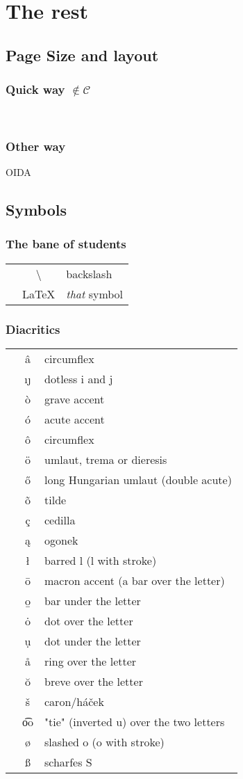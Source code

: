 \documentclass[11pt,a4paper]{report}
\newcommand{\package}[1]{\code{\usepackage{#1}}\label{#1}}
\newcommand{\noncurs}{\hspace{.5cm}$\notin \mathscr{C}$}
\newcommand{\explain}[2]{\code{#1} & #1 & #2\\}
\begin{document}
{\chapter{The rest}
\pagestyle{plain}
\section{Page Size and layout}
\subsection[Quick way]{Quick way \noncurs}
\package{geometry}\\
\code{\geometry{a4paper,left=30mm,right=20mm,top=20mm,bottom=30mm}}

\subsection{Other way}
OIDA



\section{Symbols}
\subsection{The bane of students}
\begin{longtable}{l c l}
\code{$\backslash$ \textbackslash} & \textbackslash & backslash \\
\explain{\LaTeX}{\textit{that} symbol}
\end{longtable}

\subsection{Diacritics}
\begin{longtable}{l c l}
\explain{\^{a}}{circumflex}
\explain{\i \j}{dotless i and j}
\explain{\`{o}}{grave accent}
\explain{\'{o}}{acute accent}
\explain{\^{o}}{circumflex}
\explain{\"{o}}{umlaut, trema or dieresis}
\explain{\H{o}}{long Hungarian umlaut (double acute)}
\explain{\~{o}}{tilde}
\explain{\c{c}}{cedilla}
\explain{\k{a}}{ogonek}
\explain{\l{}}{barred l (l with stroke)}
\explain{\={o}}{macron accent (a bar over the letter)}
\explain{\b{o}}{bar under the letter}
\explain{\.{o}}{dot over the letter}
\explain{\d{u}}{dot under the letter}
\explain{\r{a}}{ring over the letter}
\explain{\u{o}}{breve over the letter}
\explain{\v{s}}{caron/háček}
\explain{\t{oo}}{"tie" (inverted u) over the two letters}
\explain{\o}{slashed o (o with stroke)}
\explain{\ss}{scharfes S}
\end{longtable}

}
\end{document}

